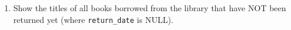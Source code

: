 \documentclass[12pt,a4paper]{article}
\begin{document}
\begin{enumerate}





    \item Show the titles of all books borrowed from the library that have NOT been returned yet (where \texttt{return\_date} is NULL).





\end{enumerate}
\end{document}
